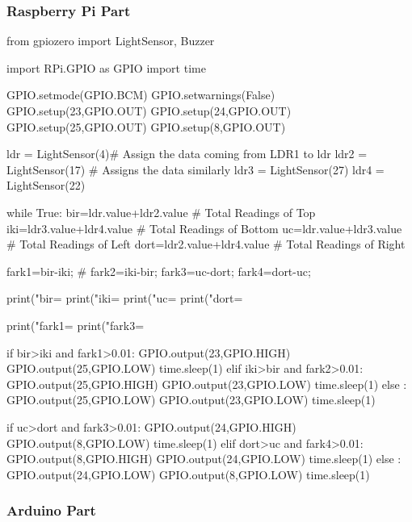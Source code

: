 \subsubsection{Raspberry Pi Part}
\begin{python}
from gpiozero import LightSensor, Buzzer 

import RPi.GPIO as GPIO  
import time  

GPIO.setmode(GPIO.BCM)  
GPIO.setwarnings(False)  
GPIO.setup(23,GPIO.OUT)  
GPIO.setup(24,GPIO.OUT)  
GPIO.setup(25,GPIO.OUT)  
GPIO.setup(8,GPIO.OUT)  

ldr = LightSensor(4)# Assign the data coming from LDR1 to ldr
ldr2 = LightSensor(17)	# Assigns the data similarly 
ldr3 = LightSensor(27)
ldr4 = LightSensor(22) 

while True: 
    bir=ldr.value+ldr2.value  # Total Readings of Top 
    iki=ldr3.value+ldr4.value # Total Readings of Bottom  
    uc=ldr.value+ldr3.value   # Total Readings of Left 
    dort=ldr2.value+ldr4.value  # Total Readings of Right
     
    fark1=bir-iki;	#  
    fark2=iki-bir;  
    fark3=uc-dort;   
    fark4=dort-uc;  

    print("bir= %
    print("iki= %
    print("uc= %
    print("dort= %

    print("fark1= %
    print("fark3= %

    if bir>iki and fark1>0.01:  
        GPIO.output(23,GPIO.HIGH) 
        GPIO.output(25,GPIO.LOW)  
    time.sleep(1)  
    elif iki>bir and fark2>0.01:  
        GPIO.output(25,GPIO.HIGH)  
        GPIO.output(23,GPIO.LOW)  
        time.sleep(1)  
    else :  
        GPIO.output(25,GPIO.LOW)  
        GPIO.output(23,GPIO.LOW)  
        time.sleep(1)  

    if uc>dort and fark3>0.01:  
        GPIO.output(24,GPIO.HIGH)  
        GPIO.output(8,GPIO.LOW)  
        time.sleep(1)  
    elif dort>uc and fark4>0.01:  
        GPIO.output(8,GPIO.HIGH)  
        GPIO.output(24,GPIO.LOW)  
        time.sleep(1)    
    else :  
        GPIO.output(24,GPIO.LOW) 
        GPIO.output(8,GPIO.LOW)  
        time.sleep(1)
\end{python}  
\subsubsection{Arduino Part}


